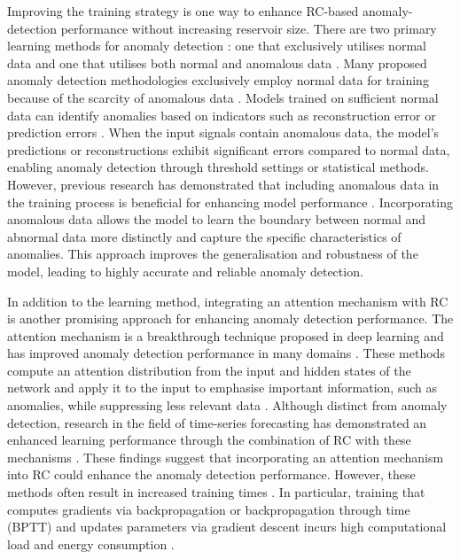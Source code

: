 \documentclass[pdflatex,sn-nature]{sn-jnl}
\theoremstyle{thmstyleone}%
\theoremstyle{thmstyletwo}%
\theoremstyle{thmstylethree}%
\begin{document}
Improving the training strategy is one way to enhance RC-based anomaly-detection performance without increasing reservoir size.
There are two primary learning methods for anomaly detection \cite{nassif2021machine}: one that exclusively utilises normal data and one that utilises both normal and anomalous data \cite{zamanzadeh2024deep,gornitz2013toward}.
Many proposed anomaly detection methodologies exclusively employ normal data for training because of the scarcity of anomalous data \cite{Hassan2021ARO,ruff2018deep}.
Models trained on sufficient normal data can identify anomalies based on indicators such as reconstruction error or prediction errors \cite{pimentel2014review,munir2018deepant,yin2020anomaly}.
When the input signals contain anomalous data, the model's predictions or reconstructions exhibit significant errors compared to normal data, enabling anomaly detection through threshold settings or statistical methods.
However, previous research has demonstrated that including anomalous data in the training process is beneficial for enhancing model performance \cite{ruff2020rethinking,pang2019deep,liznerski2020explainable}.
Incorporating anomalous data allows the model to learn the boundary between normal and abnormal data more distinctly and capture the specific characteristics of anomalies. 
This approach improves the generalisation and robustness of the model, leading to highly accurate and reliable anomaly detection.

In addition to the learning method, integrating an attention mechanism with RC is another promising approach for enhancing anomaly detection performance.
The attention mechanism is a breakthrough technique proposed in deep learning and has improved anomaly detection performance in many domains \cite{ma2024research,choi2021deep,niu2021review}.
These methods compute an attention distribution from the input and hidden states of the network and apply it to the input to emphasise important information, such as anomalies, while suppressing less relevant data \cite{ma2024research,choi2021deep,brauwers2021general,de2022attention}.
Although distinct from anomaly detection, research in the field of time-series forecasting has demonstrated an enhanced learning performance through the combination of RC with these mechanisms \cite{sakemi2024learning,koster2023attention,konishi2023insar}.
These findings suggest that incorporating an attention mechanism into RC could enhance the anomaly detection performance.
However, these methods often result in increased training times \cite{zhuang2023survey,de2022attention}.
In particular, training that computes gradients via backpropagation \cite{rumelhart1986learning} or backpropagation through time (BPTT) \cite{werbos2002backpropagation} and updates parameters via gradient descent incurs high computational load and energy consumption \cite{williams1990efficient,schmidhuber2015deep,sze2017efficient}.
\end{document}
